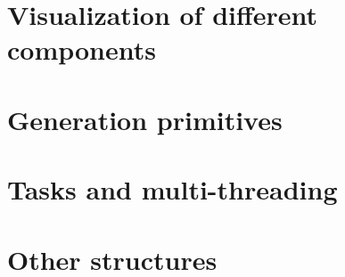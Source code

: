 \section{Visualization of different components}\label{text:03_software_components:02_visualization}
{
}

\section{Generation primitives}\label{text:03_software_components:03_generation_primitives}
{
}

\section{Tasks and multi-threading}\label{text:03_software_components:04_tasks}
{
}

\section{Other structures}\label{text:03_software_components:05_other}
{
}

